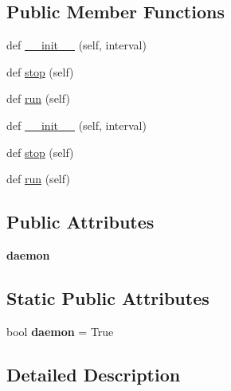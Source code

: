 \subsection*{Public Member Functions}
\begin{DoxyCompactItemize}
\item 
def \hyperlink{classremi_1_1server_1_1__UpdateThread_a4a2ff6537d731731db9d6eba47713cd7}{\+\_\+\+\_\+init\+\_\+\+\_\+} (self, interval)
\item 
def \hyperlink{classremi_1_1server_1_1__UpdateThread_a1894523d28dadfbc4d5b3be38756b5e0}{stop} (self)
\item 
def \hyperlink{classremi_1_1server_1_1__UpdateThread_adf29050ba815d4d441aeddc3475de39c}{run} (self)
\item 
def \hyperlink{classremi_1_1server_1_1__UpdateThread_a4a2ff6537d731731db9d6eba47713cd7}{\+\_\+\+\_\+init\+\_\+\+\_\+} (self, interval)
\item 
def \hyperlink{classremi_1_1server_1_1__UpdateThread_a1894523d28dadfbc4d5b3be38756b5e0}{stop} (self)
\item 
def \hyperlink{classremi_1_1server_1_1__UpdateThread_adf29050ba815d4d441aeddc3475de39c}{run} (self)
\end{DoxyCompactItemize}
\subsection*{Public Attributes}
\begin{DoxyCompactItemize}
\item 
{\bfseries daemon}\hypertarget{classremi_1_1server_1_1__UpdateThread_abe936c52d1fd19bde98a3a6c5a0d42f7}{}\label{classremi_1_1server_1_1__UpdateThread_abe936c52d1fd19bde98a3a6c5a0d42f7}

\end{DoxyCompactItemize}
\subsection*{Static Public Attributes}
\begin{DoxyCompactItemize}
\item 
bool {\bfseries daemon} = True\hypertarget{classremi_1_1server_1_1__UpdateThread_a8d6ec40d1f386283ab1c8de59711ec16}{}\label{classremi_1_1server_1_1__UpdateThread_a8d6ec40d1f386283ab1c8de59711ec16}

\end{DoxyCompactItemize}


\subsection{Detailed Description}
\begin{DoxyVerb}\end{DoxyVerb}
 

